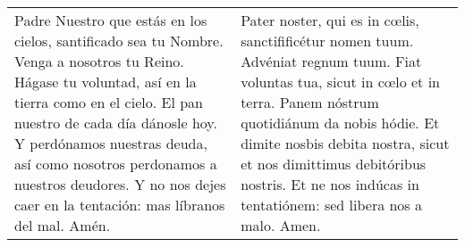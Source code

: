 \documentclass[../devocionario.tex]{subfiles}
\begin{document}
    \begin{longtable} { p{} p{} }
        Padre Nuestro que estás en los cielos, santificado sea tu Nombre. Venga a nosotros tu Reino. 
        Hágase tu voluntad, así en la tierra como en el cielo. El pan nuestro de cada día dánosle hoy. 
        Y perdónamos nuestras deuda, así como nosotros perdonamos a nuestros deudores. 
        Y no nos dejes caer en la tentación: mas líbranos del mal. Amén.
        
        &
        
        Pater noster, qui es in cœlis, sanctifificétur nomen tuum. Advéniat regnum tuum. 
        Fiat voluntas tua, sicut in cœlo et in terra. Panem nóstrum quotidiánum da nobis hódie. 
        Et dimite nosbis debita nostra, sicut et nos dimittimus debitóribus nostris. 
        Et ne nos indúcas in tentatiónem: sed libera nos a malo. Amen.
    \end{longtable}
\end{document}
